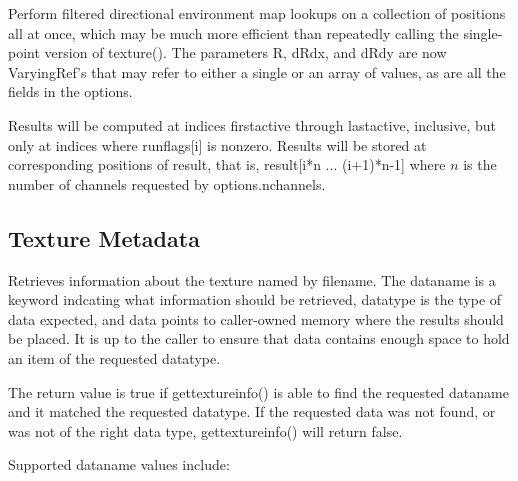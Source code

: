 Perform filtered directional environment map lookups on a collection of positions all at
once, which may be much more efficient than repeatedly calling the
single-point version of {\cf texture()}.  The parameters {\cf R},
{\cf dRdx}, and {\cf dRdy} are now
{\cf VaryingRef}'s that may refer to either a single or an array of
values, as are all the fields in the {\cf options}.

Results will be computed at indices {\cf firstactive} through
{\cf lastactive}, inclusive, but only at indices where {\cf runflags[i]}
is nonzero.  Results will be stored at corresponding positions of
{\cf result}, that is, {\cf result[i*n ... (i+1)*n-1]} where $n$ 
is the number of channels requested by {\cf options.nchannels}.
\apiend

\newpage
\subsection{Texture Metadata}
\label{sec:texturesys:api:gettextureinfo}


Retrieves information about the texture named by {\cf filename}.
The {\cf dataname} is a keyword indcating what information should
be retrieved, {\cf datatype} is the type of data expected, and
{\cf data} points to caller-owned memory where the results should be
placed.  It is up to the caller to ensure that {\cf data} contains
enough space to hold an item of the requested {\cf datatype}.

The return value is {\cf true} if {\cf gettextureinfo()} is able
to find the requested {\cf dataname} and it matched the requested
{\cf datatype}.  If the requested data was not found, or was not
of the right data type, {\cf gettextureinfo()} will return {\cf false}.

Supported {\cf dataname} values include:


